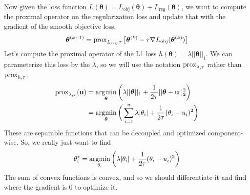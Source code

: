     Now given the loss function $L (\boldsymbol{\theta}) = L_{\mathrm{obj}} (\boldsymbol{\theta}) + L_{\mathrm{reg}} (\boldsymbol{\theta})$, we want to compute the proximal operator on the regularization loss and update that with the gradient of the smooth objective loss. 
    \begin{equation}
      \boldsymbol{\theta}^{(k+1)} = \prox_{L_{\mathrm{reg}}, \tau} \big[ \boldsymbol{\theta}^{(k)} - \tau \nabla L_{\mathrm{obj}} (\boldsymbol{\theta}^{(k)}) \big]
    \end{equation}
    Let's compute the proximal operator of the L1 loss $h(\boldsymbol{\theta}) = \lambda ||\boldsymbol{\theta}||_1$. We can parameterize this loss by the $\lambda$, so we will use the notation $\prox_{\lambda, \tau}$ rather than $\prox_{h, \tau}$. 
    \begin{align*}
      \prox_{\lambda, \tau} (\mathbf{u}) & = \argmin_{\boldsymbol{\theta}} \bigg( \lambda ||\boldsymbol{\theta}||_1 + \frac{1}{2\tau} ||\boldsymbol{\theta} - \mathbf{u}||_2^2 \bigg) \\
      & = \argmin_{\boldsymbol{\theta}} \bigg( \sum_{i=1}^n \lambda |\theta_i| + \frac{1}{2\tau} (\theta_i - u_i)^2 \bigg) 
    \end{align*}
    These are separable functions that can be decoupled and optimized component-wise. So, we really just want to find 
    \begin{equation}
      \theta_i^\ast = \argmin_{\theta_i} \bigg( \lambda |\theta_i| + \frac{1}{2\tau} (\theta_i - u_i)^2 \bigg)
    \end{equation}
    The sum of convex functions is convex, and so we should differentiate it and find where the gradient is $0$ to optimize it. 
